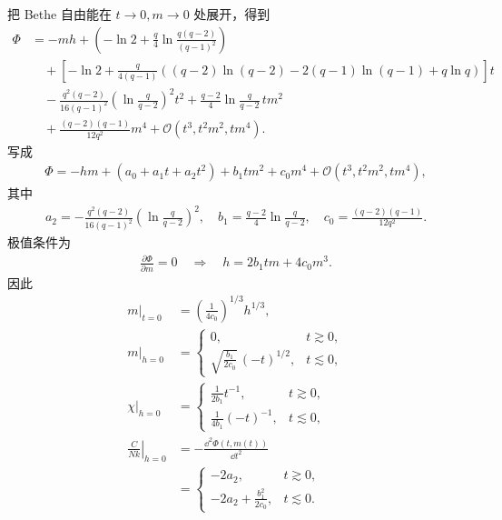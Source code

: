 把 Bethe 自由能在 \(t\to0,m\to0\) 处展开，得到
\begin{align*}
\Phi
&=-mh+
\left(-\ln2+\frac q4\ln\frac{q(q-2)}{(q-1)^2}\right)\\
&\quad+\left[
-\ln2+\frac{q}{4(q-1)}
\left((q-2)\ln(q-2)-2(q-1)\ln(q-1)+q\ln q\right)
\right]t\\
&\quad-\frac{q^2(q-2)}{16(q-1)^2}
\left(\ln\frac q{q-2}\right)^2t^2
+\frac{q-2}{4}\ln\frac q{q-2}\,tm^2\\
&\quad+\frac{(q-2)(q-1)}{12q^2}m^4
+\mathcal O(t^3,t^2m^2,tm^4).
\end{align*}
写成
\begin{align*}
\Phi=-hm+(a_0+a_1t+a_2t^2)+b_1tm^2+c_0m^4
+\mathcal O(t^3,t^2m^2,tm^4),
\end{align*}
其中
\begin{align*}
	a_2=-\frac{q^2(q-2)}{16(q-1)^2}
	\left(\ln\frac q{q-2}\right)^2,\quad
	b_1=\frac{q-2}{4}\ln\frac q{q-2},\quad
	c_0=\frac{(q-2)(q-1)}{12q^2}.
\end{align*}
极值条件为
\begin{align*}
	\frac{\partial\Phi}{\partial m}=0
	\quad\Longrightarrow\quad
	h=2b_1tm+4c_0m^3.
\end{align*}
因此
\begin{align*}
\left.m\right|_{t=0}
&=\left(\frac1{4c_0}\right)^{1/3}h^{1/3},\\
\left.m\right|_{h=0}
&=
\begin{cases}
	0,&t\gtrsim0,\\
\displaystyle\sqrt{\frac{b_1}{2c_0}}\,(-t)^{1/2},&t\lesssim0,
\end{cases}\\
\left.\chi\right|_{h=0}
&=
\begin{cases}
\displaystyle\frac1{2b_1}t^{-1},&t\gtrsim0,\\
\displaystyle\frac1{4b_1}(-t)^{-1},&t\lesssim0,
\end{cases}\\
\left.\frac C{Nk}\right|_{h=0}
&=-\frac{\dd^2\Phi(t,m(t))}{\dd t^2}\\
&=
\begin{cases}
-2a_2,&t\gtrsim0,\\
\displaystyle-2a_2+\frac{b_1^2}{2c_0},&t\lesssim0.
\end{cases}
\end{align*}
